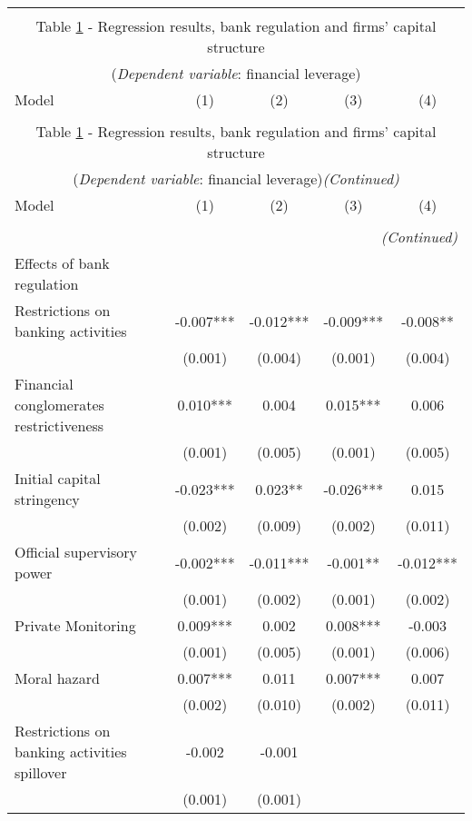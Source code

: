 \begin{longtable}{lcccc}\\
	\label{reg:base_year}\\
	\multicolumn{5}{c}{Table \ref{reg:base_year} - Regression results, bank regulation and firms' capital structure }\\
	\multicolumn{5}{c}{(\textit{Dependent variable}: financial leverage)}
	\\ \hline \hline
	Model & (1) & (2) & (3) & (4)  \\ \hline
	&  &  &  \\ \endfirsthead
	\multicolumn{5}{c}{Table \ref{reg:base_year} - Regression results, bank regulation and firms' capital structure }\\
	\multicolumn{5}{c}{(\textit{Dependent variable}: financial leverage)\textit{(Continued)}}
	\\ \hline \hline
	Model & (1) & (2) & (3) & (4)  \\ \hline 
	&  &  &  & \\ \endhead
	\hline
	\multicolumn{5}{r}{{\textit{(Continued)}}}\\ \endfoot	
	\endlastfoot
	Effects of bank regulation  &  &  &  \\
\quad Restrictions on banking activities & -0.007*** & -0.012*** & -0.009*** & -0.008** \\
 & (0.001) & (0.004) & (0.001) & (0.004) \\
\quad Financial conglomerates restrictiveness & 0.010*** & 0.004 & 0.015*** & 0.006 \\
 & (0.001) & (0.005) & (0.001) & (0.005) \\
\quad Initial capital stringency & -0.023*** & 0.023** & -0.026*** & 0.015 \\
 & (0.002) & (0.009) & (0.002) & (0.011) \\
\quad Official supervisory power & -0.002*** & -0.011*** & -0.001** & -0.012*** \\
 & (0.001) & (0.002) & (0.001) & (0.002) \\
\quad Private Monitoring & 0.009*** & 0.002 & 0.008*** & -0.003 \\
 & (0.001) & (0.005) & (0.001) & (0.006) \\
\quad Moral hazard & 0.007*** & 0.011 & 0.007*** & 0.007 \\
 & (0.002) & (0.010) & (0.002) & (0.011) \\
\quad Restrictions on banking activities spillover & -0.002 & -0.001 &  &  \\
 & (0.001) & (0.001) &  &  \\

\end{longtable}
